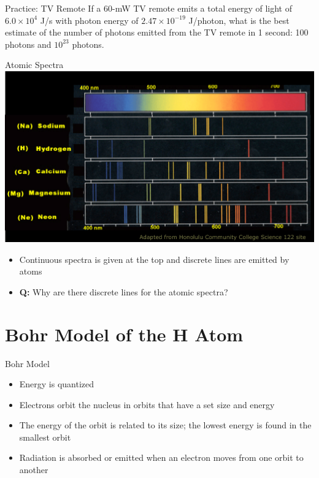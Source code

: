 \documentclass[11pt]{beamer}
\begin{document}
\begin{frame}{Practice: TV Remote}
  If a 60-mW TV remote emits a total energy of light of $6.0\times 10^4$ J/s with
  photon energy of $2.47\times 10^{-19}$ J/photon, what is the best estimate of the
  number of photons emitted from the TV remote in 1 second: 100 photons and
  $10^{23}$ photons.
  \vfill
\end{frame}

\begin{frame}{Atomic Spectra}
  \centering
  \includegraphics[width=0.85\linewidth]{cont_line}
  \begin{itemize}
  \item Continuous spectra is given at the top and
    discrete lines are emitted by atoms
  \item \textbf{Q:} Why are there discrete lines for
    the atomic spectra?
  \end{itemize}
\end{frame}

\section{Bohr Model of the H Atom}

\begin{frame}{Bohr Model}
  \begin{itemize}
  \item Energy is quantized
  \item Electrons orbit the nucleus in orbits that have
    a set size and energy
  \item The energy of the orbit is related to its size; the
    lowest energy is found in the smallest orbit
  \item Radiation is absorbed or emitted when an electron
    moves from one orbit to another
  \end{itemize}
\end{frame}
\end{document}
